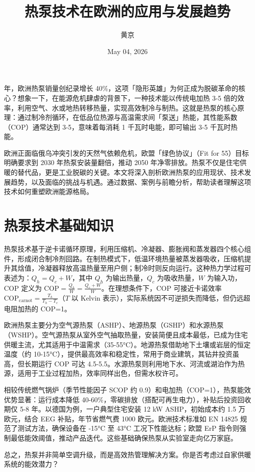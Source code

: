 \title{热泵技术在欧洲的应用与发展趋势}
\author{黄京}
\date{May 04, 2026}
 年，欧洲热泵销量创纪录增长 40\%{}，这项「隐形英雄」为何正成为脱碳革命的核心？想象一下，在能源危机肆虐的背景下，一种技术能以传统电加热 3-5 倍的效率，利用空气、水或地热转移热量，实现高效制冷与制热。这就是热泵的核心原理：通过制冷剂循环，在低品位热源与高温需求间「泵送」热能，其性能系数（COP）通常达到 3-5，意味着每消耗 1 千瓦时电能，即可输出 3-5 千瓦时热能。\par
欧洲正面临俄乌冲突引发的天然气依赖危机，欧盟「绿色协议」（Fit for 55）目标明确要求到 2030 年热泵安装量翻倍，推动 2050 年净零排放。热泵不仅是住宅供暖的替代品，更是工业脱碳的关键。本文将深入剖析欧洲热泵的应用现状、技术发展趋势，以及面临的挑战与机遇。通过数据、案例与前瞻分析，帮助读者理解这项技术如何重塑欧洲能源格局。\par
\chapter{热泵技术基础知识}
热泵技术基于逆卡诺循环原理，利用压缩机、冷凝器、膨胀阀和蒸发器四个核心组件，形成闭合制冷剂回路。在制热模式下，低温环境热量被蒸发器吸收，压缩机提升其焓值，冷凝器释放高温热量至用户侧；制冷时则反向运行。这种热力学过程可表述为：$Q_h = Q_c + W$，其中 $Q_h$ 为输出热量，$Q_c$ 为吸收热量，$W$ 为输入功，COP 定义为 $\mathrm{COP} = \frac{Q_h}{W} = \frac{Q_c + W}{W}$。在理想条件下，COP 可接近卡诺效率 $\mathrm{COP_{carnot}} = \frac{T_h}{T_h - T_c}$（$T$ 以 Kelvin 表示），实际系统因不可逆损失而降低，但仍远超电阻加热的 COP=1。\par
欧洲热泵主要分为空气源热泵（ASHP）、地源热泵（GSHP）和水源热泵（WSHP）。空气源热泵从室外空气抽取热量，安装简便且成本最低，已成为住宅供暖主流，尤其适用于中温需求（35-55°C）。地源热泵借助地下土壤或岩层的恒定温度（约 10-15°C），提供最高效率和稳定性，常用于商业建筑，其钻井投资虽高，但长期运行 COP 可达 4.5-5.5。水源热泵则利用地下水、河流或湖泊作为热源，适用于工业过程加热，效率同样出色，但需水权许可。\par
相较传统燃气锅炉（季节性能因子 SCOP 约 0.9）和电加热（COP=1），热泵能效优势显著：运行成本降低 40-60\%{}，零碳排放（搭配可再生电力），补贴后投资回收期仅 5-8 年。以德国为例，一户典型住宅安装 12 kW ASHP，初始成本约 1.5 万欧元，结合 EEG 补贴，年节省燃气费 1000 欧元。欧洲技术标准如 EN 14825 规范了测试方法，确保设备在 -15°C 至 43°C 工况下性能达标；欧盟 ErP 指令则强制最低能效阈值，推动产品迭代。这些基础确保热泵从实验室走向亿万家庭。\par
总之，热泵并非简单空调升级，而是高效热管理解决方案。你是否考虑过自家供暖系统的能效潜力？\par
